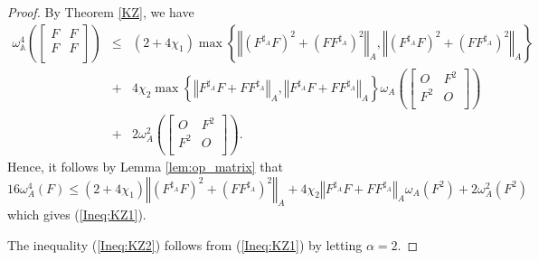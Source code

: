 \documentclass{article}
\newcommand{\bra}[1]{\left(#1\right)}
\newcommand{\normA}[1]{{\left\Vert#1\right\Vert}_{A}}
\newcommand{\set}[1]{\left\{#1\right\}}
\newcommand {\A}{\mathbb{A}}
\newcommand {\Fa}{F^{\sharp_{A}}}
\begin{document}
\begin{proof} By Theorem \ref{KZ}, we have
\begin{eqnarray*}
  \omega_{\A}^4\bra{\begin{bmatrix} F& F\\ F& F \\\end{bmatrix}} &\leq& \bra{2+4\chi_1}\max\set{\normA{(\Fa F)^2+(F\Fa)^2},\normA{(\Fa F)^2+(F\Fa)^2}}\\
   &+&4\chi_2\max\set{\normA{\Fa F+F\Fa},\normA{\Fa F+F\Fa}}\omega_A\bra{\begin{bmatrix} O& F^2\\F^2& O \\\end{bmatrix}}\\
   &+&2\omega_A^2\bra{\begin{bmatrix} O& F^2\\F^2& O \\\end{bmatrix}}.
\end{eqnarray*}
Hence, it follows by Lemma \ref{lem:op_matrix} that
$$16\omega_A^4(F)\leq \bra{2+4\chi_1}\normA{(\Fa F)^2+(F\Fa)^2}+4\chi_2\normA{\Fa F+F\Fa}\omega_A(F^2)+2\omega_A^2(F^2)$$
which gives (\ref{Ineq:KZ1}).

The inequality (\ref{Ineq:KZ2}) follows from (\ref{Ineq:KZ1}) by letting $\alpha=2$.
\end{proof}
\end{document}
